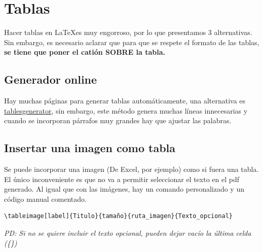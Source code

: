\begin{figure}[b]
\end{figure}

\newpage

\section{Tablas}

Hacer tablas en \LaTeX es muy engorroso, por lo que presentamos 3 alternativas. Sin embargo, es necesario aclarar que para que se respete el formato de las tablas, \textbf{se tiene que poner el catión SOBRE la tabla.}

\subsection{Generador online}
Hay muchas páginas para generar tablas automáticamente, una alternativa es \href{https://www.tablesgenerator.com}{tablesgenerator}, sin embargo, este método genera muchas líneas innecesarias y cuando se incorporan párrafos muy grandes hay que ajustar las palabras.

\subsection{Insertar una imagen como tabla}
Se puede incorporar una imagen (De Excel, por ejemplo) como si fuera una tabla. El único inconveniente es que no va a permitir seleccionar el texto en el pdf generado. Al igual que con las imágenes, hay un comando personalizado y un código manual comentado.
\begin{verbatim} 
\tableimage[label]{Titulo}{tamaño}{ruta_imagen}{Texto_opcional}
\end{verbatim}
\textit{PD: Si no se quiere incluir el texto opcional, pueden dejar vacío la última celda (\{\})}

